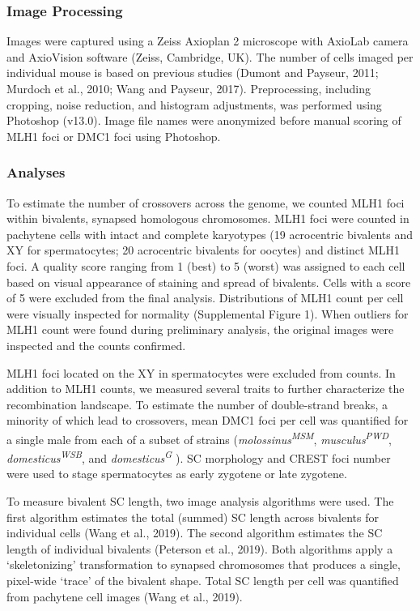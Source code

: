\documentclass[
]{article}
\begin{document}
\hypertarget{image-processing}{%
\subsubsection{Image Processing}\label{image-processing}}

Images were captured using a Zeiss Axioplan 2 microscope with AxioLab
camera and AxioVision software (Zeiss, Cambridge, UK). The number of
cells imaged per individual mouse is based on previous studies (Dumont
and Payseur, 2011; Murdoch et al., 2010; Wang and Payseur, 2017).
Preprocessing, including cropping, noise reduction, and histogram
adjustments, was performed using Photoshop (v13.0). Image file names
were anonymized before manual scoring of MLH1 foci or DMC1 foci using
Photoshop.

\hypertarget{analyses}{%
\subsubsection{Analyses}\label{analyses}}

To estimate the number of crossovers across the genome, we counted MLH1
foci within bivalents, synapsed homologous chromosomes. MLH1 foci were
counted in pachytene cells with intact and complete karyotypes (19
acrocentric bivalents and XY for spermatocytes; 20 acrocentric bivalents
for oocytes) and distinct MLH1 foci. A quality score ranging from 1
(best) to 5 (worst) was assigned to each cell based on visual appearance
of staining and spread of bivalents. Cells with a score of 5 were
excluded from the final analysis. Distributions of MLH1 count per cell
were visually inspected for normality (Supplemental Figure 1). When
outliers for MLH1 count were found during preliminary analysis, the
original images were inspected and the counts confirmed.

MLH1 foci located on the XY in spermatocytes were excluded from counts.
In addition to MLH1 counts, we measured several traits to further
characterize the recombination landscape. To estimate the number of
double-strand breaks, a minority of which lead to crossovers, mean DMC1
foci per cell was quantified for a single male from each of a subset of
strains (\emph{molossinus\textsuperscript{MSM}},
\emph{musculus\textsuperscript{PWD}},
\emph{domesticus\textsuperscript{WSB}}, and
\emph{domesticus\textsuperscript{G}} ). SC morphology and CREST foci
number were used to stage spermatocytes as early zygotene or late
zygotene.

To measure bivalent SC length, two image analysis algorithms were used.
The first algorithm estimates the total (summed) SC length across
bivalents for individual cells (Wang et al., 2019). The second algorithm
estimates the SC length of individual bivalents (Peterson et al., 2019).
Both algorithms apply a `skeletonizing' transformation to synapsed
chromosomes that produces a single, pixel-wide `trace' of the bivalent
shape. Total SC length per cell was quantified from pachytene cell
images (Wang et al., 2019).
\end{document}
